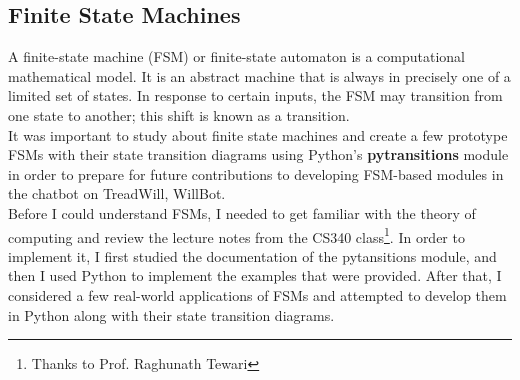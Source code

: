 \subsection{Finite State Machines}
\normalsize{
A finite-state machine (FSM) or finite-state automaton is a computational mathematical model. It is an abstract machine that is always in precisely one of a limited set of states. In response to certain inputs, the FSM may transition from one state to another; this shift is known as a transition.\cite{wang2019formal}\\

It was important to study about finite state machines and create a few prototype FSMs with their state transition diagrams using Python's \textbf{pytransitions} module in order to prepare for future contributions to developing FSM-based modules in the chatbot on TreadWill, WillBot. \\

Before I could understand FSMs, I needed to get familiar with the theory of computing and review the lecture notes from the CS340 class\footnote{Thanks to Prof. Raghunath Tewari}. In order to implement it, I first studied the documentation of the pytansitions module, and then I used Python to implement the examples that were provided. After that, I considered a few real-world applications of FSMs and attempted to develop them in Python along with their state transition diagrams.\\
}

